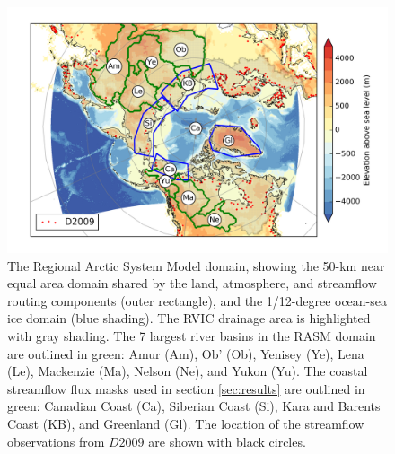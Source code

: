 \documentclass[jgrga, draft]{agutex}
\begin{document}
%
%
%
%

\clearpage
\begin{figure}
\noindent\includegraphics[width=40pc,natwidth=1]{RASM_domain_fig}
\caption{The Regional Arctic System Model domain, showing the 50-km near equal area domain shared by the land, atmosphere, and streamflow routing components (outer rectangle), and the 1/12-degree ocean-sea ice domain (blue shading).
The RVIC drainage area is highlighted with gray shading.
The 7 largest river basins in the RASM domain are outlined in green: Amur (Am), Ob' (Ob), Yenisey (Ye), Lena (Le), Mackenzie (Ma), Nelson (Ne), and Yukon (Yu).
The coastal streamflow flux masks used in section \ref{sec:results} are outlined in green: Canadian Coast (Ca), Siberian Coast (Si), Kara and Barents Coast (KB), and Greenland (Gl).
The location of the streamflow observations from $D2009$ are shown with black circles.}
\label{fig:rasm_domain}
\end{figure}
\end{document}
